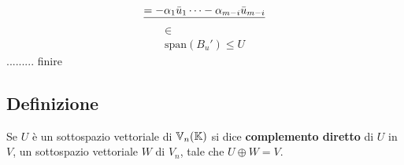 \documentclass[../main.tex]{subfiles}
\begin{document}
\[
    \underline{= -\alpha_1\bar{u}_1\cdots-\alpha_{m-i}\bar{u}_{m-i}}
\]
\[
    \substack{\in \\ \mathrm{span}(B_u') \leq U}
\]
......... finire

\subsection{Definizione}
Se $U$ è un sottospazio vettoriale di $\mathbb{V}_n (\mathbb{K})$ si dice \textbf{complemento
    diretto} di $U$ in $V$, un sottospazio vettoriale $W$ di $V_n$, tale che
$U\oplus{W} = V$.
\end{document}

